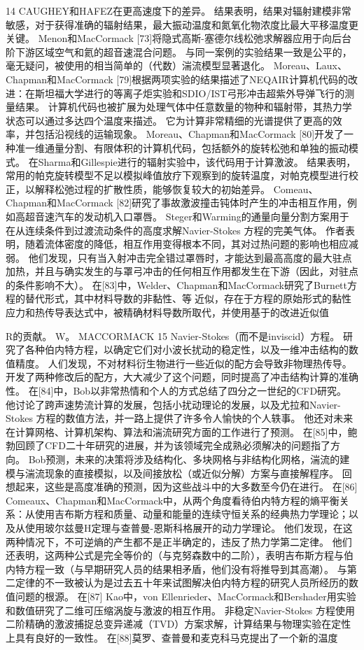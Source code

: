 \documentclass[UTF8,11pt,a4paper,openany,fontset=fandol]{ctexbook}
\begin{document}
14 CAUGHEY和HAFEZ在更高速度下的差异。 结果表明，结果对辐射建模非常敏感，对于获得准确的辐射结果，最大振动温度和氮氧化物浓度比最大平移温度更关键。 Menon和MacCormack [73]将隐式高斯-塞德尔线松弛求解器应用于向后台阶下游区域空气和氦的超音速混合问题。 与同一案例的实验结果一致是公平的，毫无疑问，被使用的相当简单的（代数）湍流模型显著退化。 Moreau、Laux、Chapman和MacCormack [79]根据两项实验的结果描述了NEQAIR计算机代码的改进：在斯坦福大学进行的等离子炬实验和SDIO/IST弓形冲击超紫外导弹飞行的测量结果。 计算机代码也被扩展为处理气体中任意数量的物种和辐射带，其热力学状态可以通过多达四个温度来描述。 它为计算非常精细的光谱提供了更高的效率，并包括沿视线的运输现象。 Moreau、Chapman和MacCormack [80]开发了一种准一维通量分割、有限体积的计算机代码，包括额外的旋转松弛和单独的振动模式。 在Sharma和Gillespie进行的辐射实验中，该代码用于计算激波。 结果表明，常用的帕克旋转模型不足以模拟峰值放疗下观察到的旋转温度，对帕克模型进行校正，以解释松弛过程的扩散性质，能够恢复较大的初始差异。 Comeau、Chapman和MacCormack [82]研究了事故激波撞击钝体时产生的冲击相互作用，例如高超音速汽车的发动机入口罩唇。 Steger和Warming的通量向量分割方案用于在从连续条件到过渡流动条件的高度求解Navier-Stokes 方程的完美气体。 作者表明，随着流体密度的降低，相互作用变得根本不同，其对过热问题的影响也相应减弱。 他们发现，只有当入射冲击完全错过罩唇时，才能达到最高高度的最大驻点加热，并且与确实发生的与罩弓冲击的任何相互作用都发生在下游（因此，对驻点的条件影响不大）。 在[83]中，Welder、Chapman和MacCormack研究了Burnett方程的替代形式，其中材料导数的非黏性、等𤆡近似，存在于方程的原始形式的黏性应力和热传导表达式中，被精确材料导数所取代，并使用基于的改进近似值

R的贡献。 W。 MACCORMACK 15 Navier-Stokes（而不是inviscid）方程。 研究了各种伯内特方程，以确定它们对小波长扰动的稳定性，以及一维冲击结构的数值精度。 人们发现，不对材料衍生物进行一些近似的配方会导致非物理热传导。 开发了两种修改后的配方，大大减少了这个问题，同时提高了冲击结构计算的准确性。 在[84]中，Bob以非常热情和个人的方式总结了四分之一世纪的CFD研究。 他讨论了跨声速势流计算的发展，包括小扰动理论的发展，以及尤拉和Navier-Stokes 方程的数值方法，并一路上提供了许多令人愉快的个人轶事。 他还对未来在计算网格、计算机架构、算法和湍流研究方面的工作进行了预测。 在[85]中，鲍勃回顾了CFD二十年研究的进展，并为该领域完全成熟必须解决的问题指了方向。 Bob预测，未来的决策将涉及结构化、多块网格与非结构化网格，湍流的建模与湍流现象的直接模拟，以及间接放松（或近似分解）方案与直接解程序。 回想起来，这些是高度准确的预测，因为这些战斗中的大多数至今仍在进行。 在[86] Comeaux、Chapman和MacCormack中，从两个角度看待伯内特方程的熵平衡关系：从使用吉布斯方程和质量、动量和能量的连续守恒关系的经典热力学理论；以及从使用玻尔兹曼H定理与查普曼-恩斯科格展开的动力学理论。 他们发现，在这两种情况下，不可逆熵的产生都不是正半确定的，违反了热力学第二定律。 他们还表明，这两种公式是完全等价的（与克努森数中的二阶），表明吉布斯方程与伯内特方程一致（与早期研究人员的结果相矛盾，他们没有将推导到其高潮）。 与第二定律的不一致被认为是过去五十年来试图解决伯内特方程的研究人员所经历的数值问题的根源。 在[87] Kao中，von Ellenrieder、MacCormack和Bershader用实验和数值研究了二维可压缩涡旋与激波的相互作用。 非稳定Navier-Stokes 方程使用二阶精确的激波捕捉总变异递减（TVD）方案求解，计算结果与物理实验在定性上具有良好的一致性。 在[88]莫罗、查普曼和麦克科马克提出了一个新的温度
\end{document}
